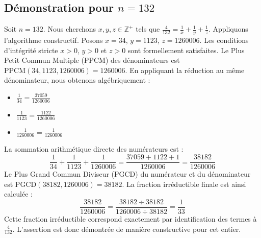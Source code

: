 \documentclass[11pt,a4paper]{article}
\begin{document}
\subsection{Démonstration pour $n = 132$}
Soit $n = 132$. Nous cherchons $x, y, z \in \mathbb{Z}^{+}$ tels que $\frac{4}{132} = \frac{1}{x} + \frac{1}{y} + \frac{1}{z}$.
Appliquons l'algorithme constructif. Posons $x = 34$, $y = 1123$, $z = 1260006$.
Les conditions d'intégrité stricte $x > 0$, $y > 0$ et $z > 0$ sont formellement satisfaites.
Le Plus Petit Commun Multiple (PPCM) des dénominateurs est $\text{PPCM}(34, 1123, 1260006) = 1260006$.
En appliquant la réduction au même dénominateur, nous obtenons algébriquement :
\begin{itemize}
    \item $\frac{1}{34} = \frac{37059}{1260006}$
    \item $\frac{1}{1123} = \frac{1122}{1260006}$
    \item $\frac{1}{1260006} = \frac{1}{1260006}$
\end{itemize}
La sommation arithmétique directe des numérateurs est :
$$ \frac{1}{34} + \frac{1}{1123} + \frac{1}{1260006} = \frac{37059 + 1122 + 1}{1260006} = \frac{38182}{1260006} $$
Le Plus Grand Commun Diviseur (PGCD) du numérateur et du dénominateur est $\text{PGCD}(38182, 1260006) = 38182$.
La fraction irréductible finale est ainsi calculée :
$$ \frac{38182}{1260006} = \frac{38182 \div 38182}{1260006 \div 38182} = \frac{1}{33} $$
Cette fraction irréductible correspond exactement par identification des termes à $\frac{4}{132}$. L'assertion est donc démontrée de manière constructive pour cet entier.
\end{document}
